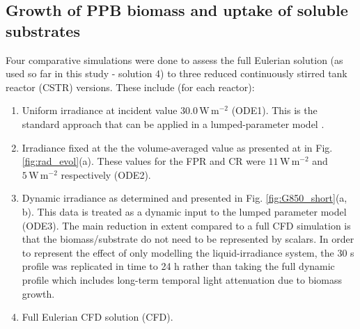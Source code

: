 \subsection{Growth of PPB biomass and uptake of soluble substrates}
\label{ssec:ppb_growth}
Four comparative simulations were done to assess the full Eulerian solution (as used so far in this study - solution 4) to three reduced continuously stirred tank reactor (CSTR) versions. These include (for each reactor):

\begin{enumerate}
    \item Uniform irradiance at incident value $\mathrm{30.0\, W\, m^{-2}}$ (ODE1). This is the standard approach that can be applied in a lumped-parameter model \cite{Bechet2013}.
    \item Irradiance fixed at the the volume-averaged value as presented at in Fig. \ref{fig:rad_evol}(a). These values for the FPR and CR were $\mathrm{11\, W\, m^{-2}}$ and $\mathrm{5\, W\, m^{-2}}$ respectively (ODE2).
    \item Dynamic irradiance as determined and presented in Fig. \ref{fig:G850_short}(a, b). This data is treated as a dynamic input to the lumped parameter model (ODE3). The main reduction in extent compared to a full CFD simulation is that the biomass/substrate do not need to be represented by scalars. In order to represent the effect of only modelling the liquid-irradiance system, the 30 s profile was replicated in time to 24 h rather than taking the full dynamic profile which includes long-term temporal light attenuation due to biomass growth.
    \item Full Eulerian CFD solution (CFD).
\end{enumerate}

